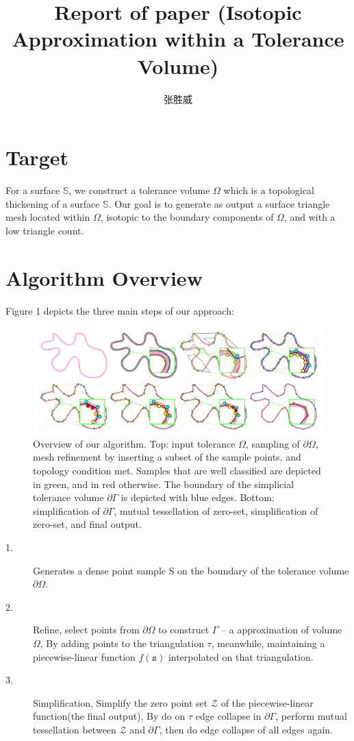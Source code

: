 \documentclass{article}
\title{Report of paper (Isotopic Approximation within a Tolerance Volume)}
\author{张胜威\\
}
\theoremstyle{definition}
\theoremstyle{remark}
\begin{document}
\maketitle

\section{Target}
For a surface $\mathbb{S}$, we construct a tolerance volume $\Omega$ which is a topological thickening of a surface $\mathbb{S}$. Our goal is to generate as output a surface triangle mesh located within $\Omega$, isotopic to the boundary components of $\Omega$, and with a low triangle count.
\section{Algorithm Overview}
Figure 1 depicts the three main steps of our approach:
\begin{figure}[H]
 	\includegraphics[width=16cm]{1}
	\caption[Overview]
 	{Overview of our algorithm. Top: input tolerance $\Omega$, sampling of $\partial \Omega$, mesh refinement by inserting a subset of the sample points, and topology condition met. Samples that are well classified are depicted in green, and in red otherwise. The boundary of the simplicial tolerance volume $\partial \Gamma$ is depicted with blue edges. Bottom: simplification of $\partial \Gamma$, mutual tessellation of zero-set, simplification of zero-set, and final output.}
 	\centering
\end{figure}
\begin{description}
  \item[1.] Generates a dense point sample S on the boundary of the tolerance volume $\partial \Omega$.
  \item[2.] Refine, select points from $\partial \Omega$ to construct $\Gamma$ -- a approximation of volume $\Omega$, By adding points to the triangulation $\tau$, meanwhile, maintaining a piecewise-linear function $f(\mathtt{s})$ interpolated on that triangulation.
  \item[3.] Simplification, Simplify the zero point set $\mathcal{Z}$ of the piecewise-linear function(the final output), By do on $\tau$ edge collapse in $\partial \Gamma$, perform mutual tessellation between $\mathcal{Z}$ and $\partial \Gamma$, then do edge collapse of all edges again.
\end{description}
\end{document}
